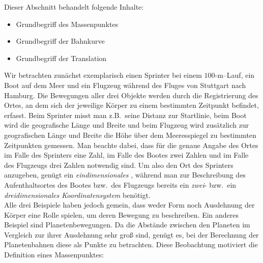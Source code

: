 

\begin{MIntro}
Dieser Abschnitt behandelt folgende Inhalte:
\begin{itemize}
\item{Grundbegriff des Massenpunktes}
\item{Grundbegriff der Bahnkurve}
\item{Grundbegriff der Translation}
\end{itemize}

Wir betrachten zun\"achst exemplarisch einen Sprinter bei einem $100$-m--Lauf, ein Boot auf dem Meer und ein Flugzeug w\"ahrend des Fluges von Stuttgart nach Hamburg. Die Bewegungen aller drei Objekte werden durch die Registrierung des Ortes, an dem sich der jeweilige K\"orper zu einem bestimmten Zeitpunkt befindet, erfasst. Beim Sprinter misst man z.B.~seine Distanz zur Startlinie, beim Boot wird die geografische L\"ange und Breite und beim Flugzeug wird zus\"atzlich zur geografischen L\"ange und Breite die H\"ohe \"uber dem Meeresspiegel zu bestimmten Zeitpunkten gemessen. Man beachte dabei, dass f\"ur die genaue Angabe des Ortes im Falle des Sprinters eine Zahl, im Falle des Bootes zwei Zahlen und im Falle des Flugzeugs drei Zahlen notwendig sind. Um also den Ort des Sprinters anzugeben, gen\"ugt ein \textit{eindimensionales} , w\"ahrend man zur Beschreibung des Aufenthaltsortes des Bootes bzw.~des Flugzeugs bereits ein \textit{zwei}- bzw.~ein \textit{dreidimensionales Koordinatensystem} ben\"otigt.\\
Alle drei Beispiele haben jedoch gemein, dass weder Form noch Ausdehnung der K\"orper eine Rolle spielen, um deren Bewegung zu beschreiben. Ein anderes Beispiel sind Planetenbewegungen. Da die Abst\"ande zwischen den Planeten im Vergleich zur ihrer Ausdehnung sehr gro{\ss} sind, gen\"ugt es, bei der Berechnung der Planetenbahnen diese als Punkte zu betrachten. Diese Beobachtung motiviert die Definition eines Massenpunktes:
\end{MIntro}


